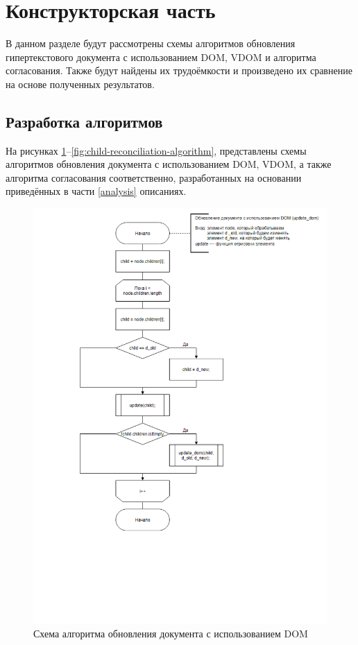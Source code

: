 \section{Конструкторская часть}

В данном разделе будут рассмотрены схемы алгоритмов обновления гипертекстового документа с использованием DOM, VDOM и алгоритма согласования. 
Также будут найдены их трудоёмкости и произведено их сравнение на основе полученных результатов.

\subsection{Разработка алгоритмов}

На рисунках \ref{fig:dom-algorithm}--\ref{fig:child-reconciliation-algorithm}, представлены схемы алгоритмов обновления документа с использованием DOM, VDOM, а также алгоритма согласования соответственно, разработанных на основании приведённых в части \ref{analysis} описаниях.

\clearpage

\begin{figure}[h]
	\centering
	\includegraphics[width=160mm]{img/dom-algorithm.png}
	\caption{Схема алгоритма обновления документа с использованием DOM}
	\label{fig:dom-algorithm}
\end{figure}

